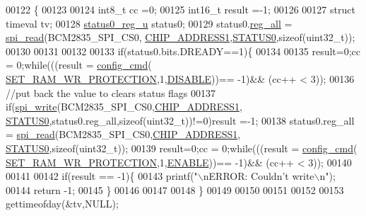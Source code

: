 \begin{DoxyCode}
00122                                 \{
00123 
00124            int8\_t cc =0;
00125            int16\_t result =-1;
00126     
00127            \textcolor{keyword}{struct }timeval tv;
00128            \hyperlink{a00031}{status0\_reg\_u} status0;
00129            status0.\hyperlink{a00031_ae44a0232a79ff51b5ef7aa80e4b35470}{reg\_all} = \hyperlink{a00006_ga7ad9f65ee46aca507374096506a0b1c4}{spi\_read}(BCM2835\_SPI\_CS0,
      \hyperlink{a00036_a94de2b046db6e10257ef4481c0a15eaa}{CHIP\_ADDRESS1},\hyperlink{a00035_aaf584f70289e5fd799fef97c85bb97ee}{STATUS0},\textcolor{keyword}{sizeof}(uint32\_t));
00130           
00131            
00132         
00133            \textcolor{keywordflow}{if}(status0.bits.DREADY==1)\{
00134     
00135            result=0;cc = 0;\textcolor{keywordflow}{while}(((result = \hyperlink{a00004_ga369ee0e8379941cbc2c79b90ec3292da}{config\_cmd}(
      \hyperlink{a00042_a5b534b9caab512045a6e762f3930a501}{SET\_RAM\_WR\_PROTECTION},1,\hyperlink{a00036_a99496f7308834e8b220f7894efa0b6ab}{DISABLE}))== -1)&& (cc++ < 3));  
00136            \textcolor{comment}{//put back the value to clears status flags         }
00137            \textcolor{keywordflow}{if}(\hyperlink{a00006_ga2770219ad8ad1eda1817c0df934b47d0}{spi\_write}(BCM2835\_SPI\_CS0,\hyperlink{a00036_a94de2b046db6e10257ef4481c0a15eaa}{CHIP\_ADDRESS1},
      \hyperlink{a00035_aaf584f70289e5fd799fef97c85bb97ee}{STATUS0},status0.reg\_all,\textcolor{keyword}{sizeof}(uint32\_t))!=0)result =-1; 
00138            status0.reg\_all = \hyperlink{a00006_ga7ad9f65ee46aca507374096506a0b1c4}{spi\_read}(BCM2835\_SPI\_CS0,\hyperlink{a00036_a94de2b046db6e10257ef4481c0a15eaa}{CHIP\_ADDRESS1},
      \hyperlink{a00035_aaf584f70289e5fd799fef97c85bb97ee}{STATUS0},\textcolor{keyword}{sizeof}(uint32\_t));
00139            result=0;cc = 0;\textcolor{keywordflow}{while}(((result = \hyperlink{a00004_ga369ee0e8379941cbc2c79b90ec3292da}{config\_cmd}(
      \hyperlink{a00042_a5b534b9caab512045a6e762f3930a501}{SET\_RAM\_WR\_PROTECTION},1,\hyperlink{a00036_a514ad415fb6125ba296793df7d1a468a}{ENABLE}))== -1)&& (cc++ < 3)); 
00140          
00141            
00142            \textcolor{keywordflow}{if}(result == -1)\{
00143                     printf(\textcolor{stringliteral}{"\(\backslash\)nERROR: Couldn't write\(\backslash\)n"});  
00144                     \textcolor{keywordflow}{return} -1;
00145            \}
00146            
00147             
00148            \}
00149            
00150            
00151            
00152         
00153            gettimeofday(&tv,NULL);

\end{DoxyCode}
